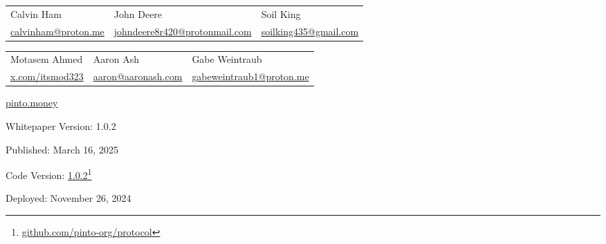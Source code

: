 \documentclass[tikz]{article}
\begin{document}
\begin{titlepage}
\begin{center}
        \vspace*{-0.52cm}

        \begin{center}
            \begin{tabular}{>{\centering\arraybackslash}p{4.6cm} >{\centering\arraybackslash}p{4.6cm} >{\centering\arraybackslash}p{4.6cm}}
                Calvin Ham & John Deere & Soil King \\
                 \href{mailto:calvinham@proton.me}{\normalsize{calvinham@proton.me}} & \href{mailto:johndeere8r420@protonmail.com}{\normalsize{johndeere8r420@protonmail.com}} & \href{mailto:soilking435@gmail.com}{\normalsize{soilking435@gmail.com}}
            \end{tabular}
        \end{center}

        \vspace*{-0.52cm}

        \begin{center}
            \begin{tabular}{>{\centering\arraybackslash}p{4.6cm} >{\centering\arraybackslash}p{4.6cm} >{\centering\arraybackslash}p{4.6cm}}
                Motasem Ahmed & Aaron Ash & Gabe Weintraub \\
                \href{https://x.com/itsmod323}{\normalsize{x.com/itsmod323}} & \href{mailto:aaron@aaronash.com}{\normalsize{aaron@aaronash.com}} & \href{mailto:gabeweintraub1@proton.me}{\normalsize{gabeweintraub1@proton.me}}
            \end{tabular}
        \end{center}


        \normalsize{\href{https://pinto.money/}{pinto.money}}

        \footnotesize{Whitepaper Version:} {\normalsize{1.0.2}}

        \vspace{-0.25cm}
        \footnotesize{Published:} {\normalsize{March 16, 2025}}

        \vspace{-0.25cm}
        \footnotesize{Code Version:} \href{https://github.com/pinto-org/protocol}{\normalsize{1.0.2}}\footnote{\href{https://github.com/pinto-org/protocol}{github.com/pinto-org/protocol}}

        \vspace{-0.25cm}
        \footnotesize{Deployed:} {\normalsize{November 26, 2024}}
        

\end{center}
\end{titlepage}
\end{document}
